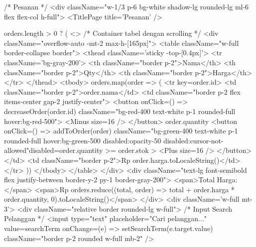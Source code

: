 {          {/* Pesanan */}
          <div className="w-1/3 p-6 bg-white shadow-lg rounded-lg ml-6 flex flex-col h-full">
            <TitlePage title='Pesanan' />
            {orders.length > 0 ? (
              <>
                {/* Container tabel dengan scrolling */}
                <div className="overflow-auto -mt-2 max-h-[165px]">
                  <table className="w-full border-collapse border">
                    <thead className='sticky -top-[0.4px]'>
                      <tr className='bg-gray-200'>
                        <th className="border p-2">Nama</th>
                        <th className="border p-2">Qty</th>
                        <th className="border p-2">Harga</th>
                      </tr>
                    </thead>
                    <tbody>
                      {orders.map(order => (
                        <tr key={order.id}>
                          <td className="border p-2">{order.nama}</td>
                          <td className="border p-2 flex items-center gap-2 justify-center">
                            <button onClick={() => decreaseOrder(order.id)} className="bg-red-400 text-white p-1 rounded-full hover:bg-red-500">
                              <Minus size={16} />
                            </button>
                            {order.quantity}
                            <button onClick={() => addToOrder(order)} className="bg-green-400 text-white p-1 rounded-full hover:bg-green-500 disabled:opacity-50 disabled:cursor-not-allowed"disabled={order.quantity >= order.stok} >
                              <Plus size={16} />
                            </button>
                          </td>
                          <td className="border p-2">Rp {order.harga.toLocaleString()}</td>
                        </tr>
                      ))}
                    </tbody>
                  </table>
                </div>
                <div className="text-lg font-semibold flex justify-between border-y-2 py-1 border-gray-200">
                  <span>Total Harga:</span>
                  <span>Rp {orders.reduce((total, order) => total + order.harga * order.quantity, 0).toLocaleString()}</span>
                </div>
                <div className='w-full mt-3'>
                  <div className="relative border rounded-lg w-full">
                  {/* Input Search Pelanggan */}
                  <input
                    type="text"
                    placeholder="Cari pelanggan..."
                    value={searchTerm}
                    onChange={(e) => setSearchTerm(e.target.value)}
                    className="border p-2 rounded w-full mb-2"
                  />

}}
